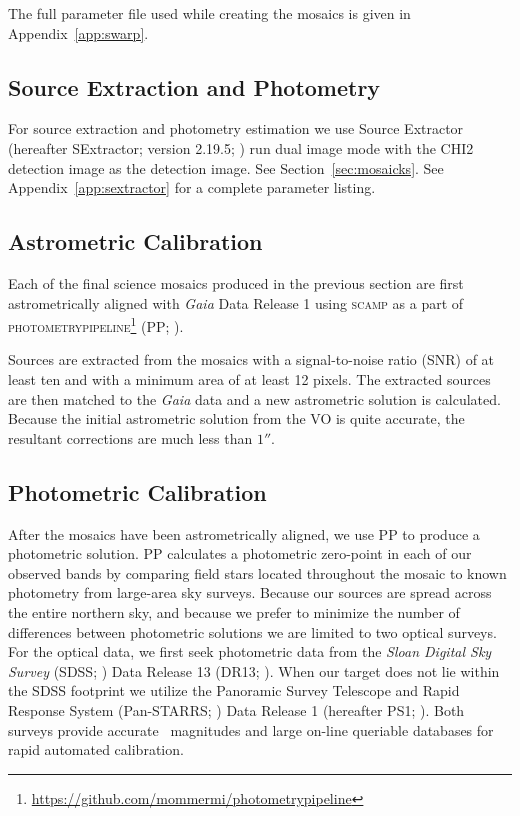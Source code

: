 \documentclass[apj, revtex4-1]{emulateapj}
\begin{document}

The full parameter file used while creating the mosaics is given in Appendix~\ref{app:swarp}.

\subsection{Source Extraction and Photometry}\label{sec:sextractor}
For source extraction and photometry estimation we use Source Extractor (hereafter SExtractor; version 2.19.5; \citealt{Bertin1996}) run dual image mode with the CHI2 detection image as the detection image. See Section~\ref{sec:mosaicks}. See Appendix~\ref{app:sextractor} for a complete parameter listing.

\subsection{Astrometric Calibration}
Each of the final science mosaics produced in the previous section are first astrometrically aligned with \textit{Gaia} \citep{GaiaCollaboration2016} Data Release 1 \citep{GaiaCollaboration2016a} using \textsc{scamp} \citep{Bertin2006} as a part of \textsc{photometrypipeline}\footnote{\url{https://github.com/mommermi/photometrypipeline}} (PP; \citealt{Mommert2017}).

Sources are extracted from the mosaics with a signal-to-noise ratio (SNR) of at least ten and with a minimum area of at least 12 pixels. The extracted sources are then matched to the \textit{Gaia} data and a new astrometric solution is calculated. Because the initial astrometric solution from the VO is quite accurate, the resultant corrections are much less than $1''$.

\subsection{Photometric Calibration}
After the mosaics have been astrometrically aligned, we use PP to produce a photometric solution. PP calculates a photometric zero-point in each of our observed bands by comparing field stars located throughout the mosaic to known photometry from large-area sky surveys. Because our sources are spread across the entire northern sky, and because we prefer to minimize the number of differences between photometric solutions we are limited to two optical surveys. For the optical data, we first seek photometric data from the \textit{Sloan Digital Sky Survey} (SDSS; \citealt{York2000}) Data Release 13 (DR13; \citealt{Albareti2017}). When our target does not lie within the SDSS footprint we utilize the Panoramic Survey Telescope and Rapid Response System (Pan-STARRS; \citealt{Chambers2016}) Data Release 1 (hereafter PS1; \citealt{Flewelling2016}). Both surveys provide accurate \sdssg\sdssr\sdssi\sdssz\ magnitudes and large on-line queriable databases for rapid automated calibration.
\end{document}
